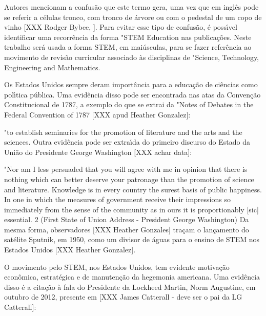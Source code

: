 \documentclass[
12pt,		%
openright,	%
twoside,  %
a4paper,			%
chapter=TITLE,		%
english,			%
french,				%
spanish,			%
brazil				%
]{USPSC-classe/USPSC}
\begin{document}
Autores mencionam a confus\~ao que este termo gera, uma vez que em ingl\^es pode se referir a c\'elulas tronco, com tronco de \'arvore ou com o pedestal de um copo de vinho [XXX Rodger Bybee, ]. Para evitar esse tipo de confus\~ao, \'e poss\'{\i}vel identificar uma recorr\^encia da forma "STEM Education nas publica\c{c}\~oes. Neste trabalho ser\'a usada a forma STEM, em mai\'usculas, para se fazer refer\^encia ao movimento de revis\~ao curricular associado \`as disciplinas de "Science, Technology, Engineering and Mathematics.  




Os Estados Unidos sempre deram import\^ancia para a educa\c{c}\~ao de ci\^encias como pol\'{\i}tica p\'ublica. Uma evid\^encia disso pode ser encontrada nas atas da Conven\c{c}\~ao Constitucional de 1787, a exemplo do que se extrai da "Notes of Debates in the Federal Convention of 1787 [XXX apud Heather Gonzalez]:




"to establish seminaries for the promotion of literature and the arts and the sciences.
Outra evid\^encia pode ser extra\'{\i}da do primeiro discurso do Estado da Uni\~ao do Presidente George Washington [XXX achar data]:




"Nor am I less persuaded that you will agree with me in opinion that there is nothing which can better deserve your patronage than the promotion of science and literature. Knowledge is in every country the surest basis of public happiness. In one in which the measures of government receive their impressions so immediately from the sense of the community as in ours it is proportionably [sic] essential. 2 (First State of Union Address - President George Washington)
Da mesma forma, observadores [XXX Heather Gonzales] tra\c{c}am o lan\c{c}amento do sat\'elite Sputnik, em 1950, como um divisor de \'aguas para o ensino de STEM nos Estados Unidos [XXX Heather Gonzalez].




O movimento pelo STEM, nos Estados Unidos, tem evidente motiva\c{c}\~ao econ\^omica, estrat\'egica e de manuten\c{c}\~ao da hegemonia americana. Uma evid\^encia disso \'e a cita\c{c}\~ao \`a fala do Presidente da Lockheed Martin, Norm Augustine, em outubro de 2012, presente em [XXX James Catterall - deve ser o pai da LG Catterall]:
\end{document}
